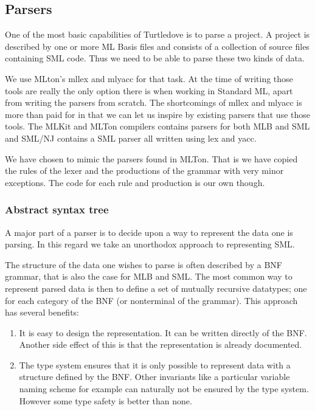 \subsection{Parsers}
\label{sec:design-parsers}

One of the most basic capabilities of Turtledove is to parse a project. A
project is described by one or more ML Basis files and consists of a collection
of source files containing SML code. Thus we need to be able to parse these two
kinds of data.

We use MLton's mllex and mlyacc for that task. At the time of writing those tools are
really the only option there is when working in Standard ML, apart from writing
the parsers from scratch. The shortcomings of mllex and mlyacc is more than
paid for in that we can let us inspire by existing parsers that use those
tools. The MLKit and MLTon compilers contains parsers for both MLB and SML and
SML/NJ contains a SML parser all written using lex and yacc.

We have chosen to mimic the parsers found in MLTon. That is we have copied the
rules of the lexer and the productions of the grammar with very minor
exceptions. The code for each rule and production is our own though.


\subsubsection{Abstract syntax tree}

A major part of a parser is to decide upon a way to represent the data one is
parsing. In this regard we take an unorthodox approach to representing SML.

The structure of the data one wishes to parse is often described by a BNF
grammar, that is also the case for MLB and SML. The most common way to represent
parsed data is then to define a set of mutually recursive datatypes; one for
each category of the BNF (or nonterminal of the grammar). This approach has
several benefits:

\begin{enumerate}
\item It is easy to design the representation. It can be written directly of the
      BNF. Another side effect of this is that the representation is already
      documented.
\item The type system ensures that it is only possible to represent data with a
      structure defined by the BNF. Other invariants like a particular variable
      naming scheme for example can naturally not be ensured by the type
      system. However some type safety is better than none.
\end{enumerate}

